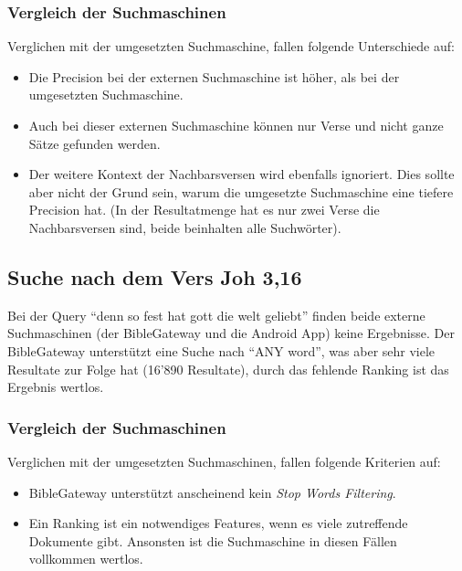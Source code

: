 \subsubsection{Vergleich der Suchmaschinen}
Verglichen mit der umgesetzten Suchmaschine, fallen folgende Unterschiede auf:
\begin{itemize}[noitemsep]
	\item Die Precision bei der externen Suchmaschine ist höher, als bei der umgesetzten Suchmaschine. 
	\item Auch bei dieser externen Suchmaschine können nur Verse und nicht ganze Sätze gefunden werden.
	\item Der weitere Kontext der Nachbarsversen wird ebenfalls ignoriert.
	Dies sollte aber nicht der Grund sein, warum die umgesetzte Suchmaschine eine tiefere Precision hat. (In der Resultatmenge hat es nur zwei Verse die Nachbarsversen sind, beide beinhalten alle Suchwörter).
\end{itemize}



\subsection{Suche nach dem Vers Joh 3,16}
Bei der Query "`denn so fest hat gott die welt geliebt"' finden beide externe Suchmaschinen (der BibleGateway und die Android App) keine Ergebnisse.
Der BibleGateway unterstützt eine Suche nach "`ANY word"', was aber sehr viele Resultate zur Folge hat (16'890 Resultate), durch das fehlende Ranking ist das Ergebnis wertlos.

\subsubsection{Vergleich der Suchmaschinen}
Verglichen mit der umgesetzten Suchmaschinen, fallen folgende Kriterien auf:
\begin{itemize}[noitemsep]
	\item BibleGateway unterstützt anscheinend kein \textit{Stop Words Filtering}.
	\item Ein Ranking ist ein notwendiges Features, wenn es viele zutreffende Dokumente gibt. Ansonsten ist die Suchmaschine in diesen Fällen vollkommen wertlos.
\end{itemize}

